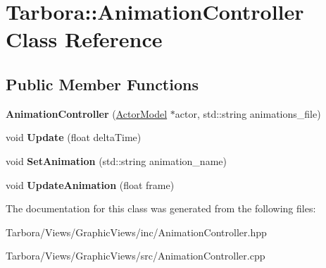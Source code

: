 \hypertarget{classTarbora_1_1AnimationController}{}\section{Tarbora\+:\+:Animation\+Controller Class Reference}
\label{classTarbora_1_1AnimationController}
\subsection*{Public Member Functions}
\begin{DoxyCompactItemize}
\item 
\mbox{\label{classTarbora_1_1AnimationController_a3646c4571530d81d0b0dc58e0aab08fe}} 
{\bfseries Animation\+Controller} (\hyperlink{classTarbora_1_1ActorModel}{Actor\+Model} $\ast$actor, std\+::string animations\+\_\+file)
\item 
\mbox{\label{classTarbora_1_1AnimationController_a5e16fba3e32db6e6ac061a54ae9949b1}} 
void {\bfseries Update} (float delta\+Time)
\item 
\mbox{\label{classTarbora_1_1AnimationController_a82ebfc6b041c20700252196c7aefc656}} 
void {\bfseries Set\+Animation} (std\+::string animation\+\_\+name)
\item 
\mbox{\label{classTarbora_1_1AnimationController_aa5f632bc3c8cea954f083f52d715ccf1}} 
void {\bfseries Update\+Animation} (float frame)
\end{DoxyCompactItemize}


The documentation for this class was generated from the following files\+:\begin{DoxyCompactItemize}
\item 
Tarbora/\+Views/\+Graphic\+Views/inc/Animation\+Controller.\+hpp\item 
Tarbora/\+Views/\+Graphic\+Views/src/Animation\+Controller.\+cpp\end{DoxyCompactItemize}
